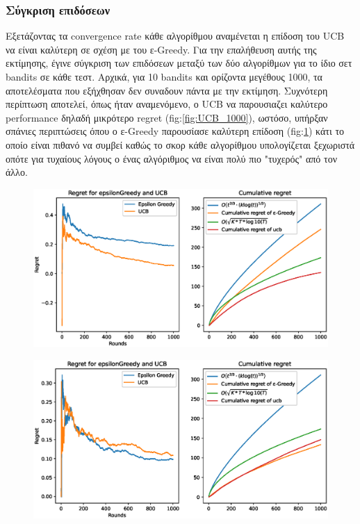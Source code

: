 \subsubsection*{Σύγκριση επιδόσεων}

Εξετάζοντας τα convergence rate κάθε αλγορίθμου αναμένεται η επίδοση του UCB να είναι καλύτερη σε σχέση με του ε-Greedy. Για την επαλήθευση αυτής της εκτίμησης, έγινε σύγκριση των επιδόσεων μεταξύ των δύο αλγορίθμων για το ίδιο σετ bandits σε κάθε τεστ. Αρχικά, για 10 bandits και ορίζοντα μεγέθους 1000, τα αποτελέσματα που εξήχθησαν δεν συναδουν πάντα με την εκτίμηση. Συχνότερη περίπτωση αποτελεί, όπως ήταν αναμενόμενο, ο UCB να παρουσιαζει καλύτερο performance δηλαδή μικρότερο regret (fig:\ref{fig:UCB_1000}), ωστόσο, υπήρξαν σπάνιες περιπτώσεις όπου ο ε-Greedy παρουσίασε καλύτερη επίδοση (fig:\ref{fig:epsilon_1000}) κάτι το οποίο είναι πιθανό να συμβεί καθώς το σκορ κάθε αλγορίθμου υπολογίζεται ξεχωριστά οπότε για τυχαίους λόγους ο ένας αλγόριθμος να είναι πολύ πιο "τυχερός" από τον άλλο. 

\begin{figure}[h]
	\centering
	\begin{minipage}{.5\textwidth} 
	  \centering
	  \includegraphics[width=1\linewidth]{Images/Regret10_1000_UCB.eps}
	  \label{fig:UCB_1000}
	\end{minipage}%
	\begin{minipage}{.5\textwidth}
		\centering
		\includegraphics[width=1\linewidth]{Images/Regret10_1000_epsilon.eps}
		\label{fig:epsilon_1000}
	\end{minipage}
\end{figure}
\clearpage

